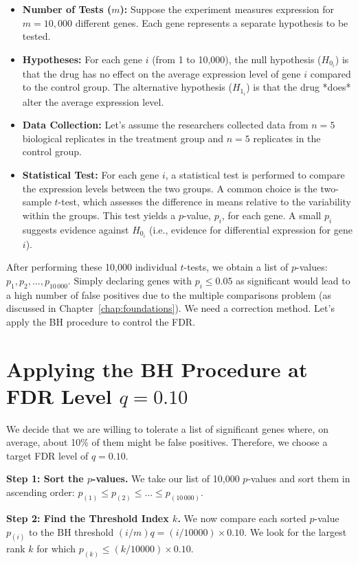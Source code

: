 \documentclass[12pt]{book}
\newcommand{\pvalue}{$p$-value}          %
\newcommand{\Hnull}{H_0}                 %
\newcommand{\Halt}{H_1}                  %
\begin{document}
\begin{itemize}
    \item \textbf{Number of Tests ($m$):} Suppose the experiment measures expression for $m=10{,}000$ different genes. Each gene represents a separate hypothesis to be tested.
    \item \textbf{Hypotheses:} For each gene $i$ (from 1 to 10,000), the null hypothesis ($\Hnull_i$) is that the drug has no effect on the average expression level of gene $i$ compared to the control group. The alternative hypothesis ($\Halt_i$) is that the drug *does* alter the average expression level.
    \item \textbf{Data Collection:} Let's assume the researchers collected data from $n=5$ biological replicates in the treatment group and $n=5$ replicates in the control group.
    \item \textbf{Statistical Test:} For each gene $i$, a statistical test is performed to compare the expression levels between the two groups. A common choice is the two-sample $t$-test, which assesses the difference in means relative to the variability within the groups. This test yields a \pvalue{}, $p_i$, for each gene. A small $p_i$ suggests evidence against $\Hnull_i$ (i.e., evidence for differential expression for gene $i$).
\end{itemize}
After performing these 10,000 individual $t$-tests, we obtain a list of \pvalue s: $p_1, p_2, \dots, p_{10\,000}$. Simply declaring genes with $p_i \le 0.05$ as significant would lead to a high number of false positives due to the multiple comparisons problem (as discussed in Chapter~\ref{chap:foundations}). We need a correction method. Let's apply the BH procedure to control the FDR.

\section{Applying the BH Procedure at FDR Level \texorpdfstring{$q=0.10$}{q=0.10}}
We decide that we are willing to tolerate a list of significant genes where, on average, about 10\% of them might be false positives. Therefore, we choose a target FDR level of $q = 0.10$.

\textbf{Step 1: Sort the \pvalue s.}
We take our list of 10,000 \pvalue s and sort them in ascending order:
$p_{(1)} \le p_{(2)} \le \dots \le p_{(10\,000)}$.

\textbf{Step 2: Find the Threshold Index $k$.}
We now compare each sorted \pvalue{} $p_{(i)}$ to the BH threshold $(i/m)q = (i/10000) \times 0.10$. We look for the largest rank $k$ for which $p_{(k)} \le (k/10000) \times 0.10$.
\end{document}
